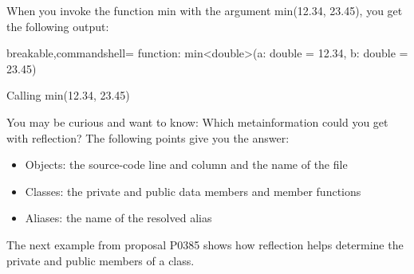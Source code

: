 When you invoke the function min with the argument min(12.34, 23.45), you get the following output:

\begin{tcblisting}{breakable,commandshell={}}
function: min<double>(a: double = 12.34, b: double = 23.45)
\end{tcblisting}

\begin{center}
Calling min(12.34, 23.45)
\end{center}

You may be curious and want to know: Which metainformation could you get with reflection? The following points give you the answer:

\begin{itemize}
\item 
Objects: the source-code line and column and the name of the file

\item 
Classes: the private and public data members and member functions

\item 
Aliases: the name of the resolved alias
\end{itemize}

The next example from proposal P0385 shows how reflection helps determine the private and public members of a class.


